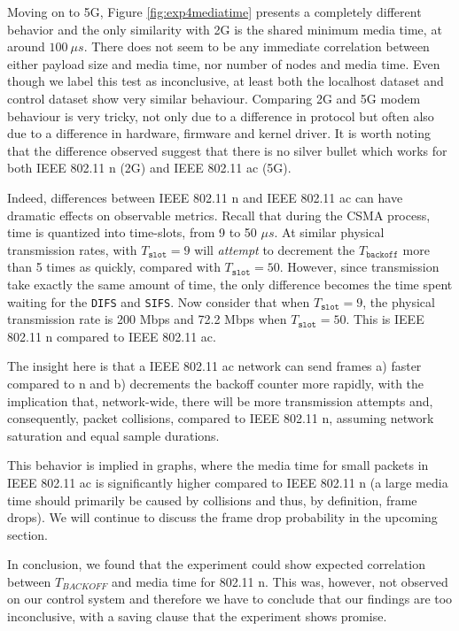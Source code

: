 Moving on to 5G, Figure \ref{fig:exp4mediatime} presents a completely different
behavior and the only similarity with 2G is the shared minimum media time, at around $100~\mu s$. There does not seem to be any immediate correlation between either payload size and media time, nor number of nodes and media time. Even though
we label this test as inconclusive, at least both the localhost dataset and control dataset show very similar behaviour. Comparing 2G and 5G modem behaviour is very tricky, not only due to a difference in protocol but often also due
to a difference in hardware, firmware and kernel driver. It is worth noting that
the difference observed suggest that there is no silver bullet which works for
both IEEE 802.11 n (2G) and IEEE 802.11 ac (5G).

Indeed, differences between IEEE 802.11 n and IEEE 802.11 ac can have dramatic effects
on observable metrics. Recall that during the CSMA process, time is quantized into time-slots, from 9
to 50 $\mu s$. At similar physical transmission rates, with $T_{\texttt{slot}}
= 9$ will \emph{attempt} to decrement the $T_{\texttt{backoff}}$ more than 5
times as quickly, compared with $T_\texttt{slot} = 50$. However, since
transmission take exactly the same amount of time, the only difference becomes
the time spent waiting for the \texttt{DIFS} and \texttt{SIFS}. Now consider
that when $T_{\texttt{slot}} = 9$, the physical transmission rate is 200 Mbps
and 72.2 Mbps when $T_{\texttt{slot}} = 50$. This is IEEE 802.11 n compared to
IEEE 802.11 ac. 

The insight here is that a IEEE 802.11 ac network can send
frames a) faster compared to n and b) decrements the backoff counter more
rapidly, with the implication that, network-wide, there will be more
transmission attempts and, consequently, packet collisions, compared to
IEEE 802.11 n, assuming network saturation and equal sample durations.

This behavior is implied in graphs, where the media time for small packets in IEEE 802.11 ac is significantly higher compared to IEEE 802.11 n (a large media time should primarily be caused by collisions and thus, by definition, frame drops). We will continue to discuss the frame drop probability in the upcoming section.

In conclusion, we found that the experiment could show expected correlation between $T_{BACKOFF}$ and media time for 802.11 n. This was, however, not
observed on our control system and therefore we have to conclude that our findings are too inconclusive, with a saving clause that the experiment shows promise.

